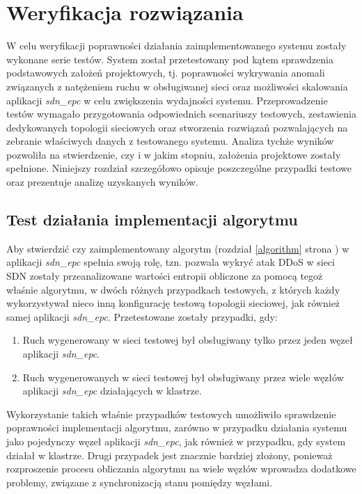 \chapter{Weryfikacja rozwiązania}

W celu weryfikacji poprawności działania zaimplementowanego systemu zostały
wykonane serie testów. System został przetestowany pod kątem sprawdzenia
podstawowych założeń projektowych, tj. poprawności wykrywania anomali związanych
z natężeniem ruchu w obsługiwanej sieci oraz możliwości skalowania
aplikacji \textit{sdn\_epc} w celu zwiększenia wydajności systemu.
Przeprowadzenie testów wymagało przygotowania odpowiednich scenariuszy testowych,
zestawienia dedykowanych topologii sieciowych oraz stworzenia rozwiązań
pozwalających na zebranie właściwych danych z testowanego systemu. Analiza
tychże wyników pozwoliła na stwierdzenie, czy i w jakim stopniu, założenia
projektowe zostały spełnione. Niniejszy rozdział szczegółowo opisuje
poszczególne przypadki testowe oraz prezentuje analizę uzyskanych wyników.

\section{Test działania implementacji algorytmu}

Aby stwierdzić czy zaimplementowany algorytm (rozdział \ref{algorithm} strona
\pageref{algorithm}) w aplikacji \textit{sdn\_epc} spełnia swoją rolę, tzn.
pozwala wykryć atak DDoS w sieci SDN zostały przeanalizowane wartości entropii
obliczone za pomocą tegoż właśnie algorytmu, w dwóch różnych przypadkach
testowych, z których każdy wykorzystywał nieco inną konfigurację testową
topologii sieciowej, jak również samej aplikacji \textit{sdn\_epc}.
Przetestowane zostały przypadki, gdy:
\begin{enumerate}
  \item Ruch wygenerowany w sieci testowej był obsługiwany tylko przez jeden
    węzeł aplikacji \textit{sdn\_epc}.
  \item Ruch wygenerowanych w sieci testowej był obsługiwany przez wiele węzłów
    aplikacji \textit{sdn\_epc} działających w klastrze.
\end{enumerate}
Wykorzystanie takich właśnie przypadków testowych umożliwiło sprawdzenie
poprawności implementacji algorytmu, zarówno w przypadku działania systemu jako
pojedynczy węzeł aplikacji \textit{sdn\_epc}, jak również w przypadku, gdy
system działał w klastrze. Drugi przypadek jest znacznie bardziej złożony,
ponieważ rozproszenie procesu obliczania algorytmu na wiele węzłów wprowadza
dodatkowe problemy, związane z synchronizacją stanu pomiędzy węzłami.


